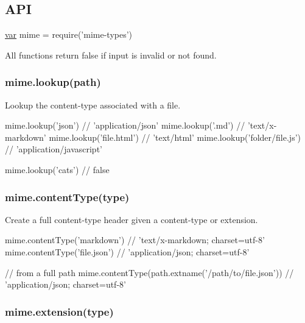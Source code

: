 \subsection*{A\+P\+I}


\begin{DoxyCode}
\hyperlink{018__def_8c_a335628f2e9085305224b4f9cc6e95ed5}{var} mime = require(\textcolor{stringliteral}{'mime-types'})
\end{DoxyCode}


All functions return {\ttfamily false} if input is invalid or not found.

\subsubsection*{mime.\+lookup(path)}

Lookup the content-\/type associated with a file.


\begin{DoxyCode}
mime.lookup(\textcolor{stringliteral}{'json'})           \textcolor{comment}{// 'application/json'}
mime.lookup(\textcolor{stringliteral}{'.md'})            \textcolor{comment}{// 'text/x-markdown'}
mime.lookup(\textcolor{stringliteral}{'file.html'})      \textcolor{comment}{// 'text/html'}
mime.lookup(\textcolor{stringliteral}{'folder/file.js'}) \textcolor{comment}{// 'application/javascript'}

mime.lookup(\textcolor{stringliteral}{'cats'}) \textcolor{comment}{// false}
\end{DoxyCode}


\subsubsection*{mime.\+content\+Type(type)}

Create a full content-\/type header given a content-\/type or extension.


\begin{DoxyCode}
mime.contentType(\textcolor{stringliteral}{'markdown'})  \textcolor{comment}{// 'text/x-markdown; charset=utf-8'}
mime.contentType(\textcolor{stringliteral}{'file.json'}) \textcolor{comment}{// 'application/json; charset=utf-8'}

\textcolor{comment}{// from a full path}
mime.contentType(path.extname(\textcolor{stringliteral}{'/path/to/file.json'})) \textcolor{comment}{// 'application/json; charset=utf-8'}
\end{DoxyCode}


\subsubsection*{mime.\+extension(type)}

